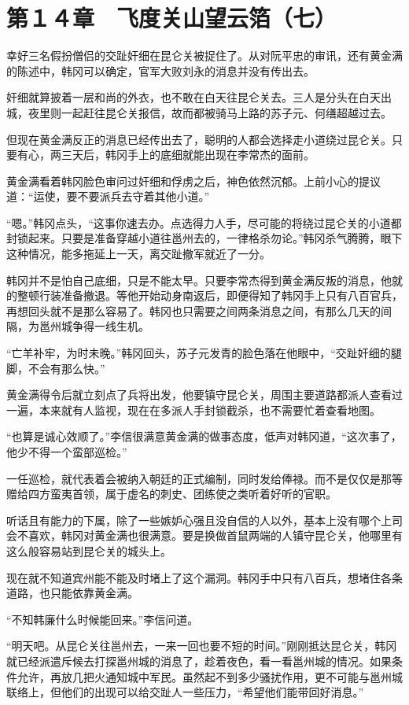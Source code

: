 \section{第１４章　飞度关山望云箔（七）}

幸好三名假扮僧侣的交趾奸细在昆仑关被捉住了。从对阮平忠的审讯，还有黄金满的陈述中，韩冈可以确定，官军大败刘永的消息并没有传出去。

奸细就算披着一层和尚的外衣，也不敢在白天往昆仑关去。三人是分头在白天出城，夜里则一起赶往昆仑关报信，故而都被骑马上路的苏子元、何缮超越过去。

但现在黄金满反正的消息已经传出去了，聪明的人都会选择走小道绕过昆仑关。只要有心，两三天后，韩冈手上的底细就能出现在李常杰的面前。

黄金满看着韩冈脸色审问过奸细和俘虏之后，神色依然沉郁。上前小心的提议道：“运使，要不要派兵去守着其他小道。”

“嗯。”韩冈点头，“这事你速去办。点选得力人手，尽可能的将绕过昆仑关的小道都封锁起来。只要是准备穿越小道往邕州去的，一律格杀勿论。”韩冈杀气腾腾，眼下这种情况，能多拖延上一天，离交趾撤军就近了一分。

韩冈并不是怕自己底细，只是不能太早。只要李常杰得到黄金满反叛的消息，他就的整顿行装准备撤退。等他开始动身南返后，即便得知了韩冈手上只有八百官兵，再想回头就不是那么容易了。韩冈也只需要之间两条消息之间，有那么几天的间隔，为邕州城争得一线生机。

“亡羊补牢，为时未晚。”韩冈回头，苏子元发青的脸色落在他眼中，“交趾奸细的腿脚，不会有那么快。”

黄金满得令后就立刻点了兵将出发，他要镇守昆仑关，周围主要道路都派人查看过一遍，本来就有人监视，现在在多派人手封锁截杀，也不需要忙着查看地图。

“也算是诚心效顺了。”李信很满意黄金满的做事态度，低声对韩冈道，“这次事了，他少不得一个蛮部巡检。”

一任巡检，就代表着会被纳入朝廷的正式编制，同时发给俸禄。而不是仅仅是那等赠给四方蛮夷首领，属于虚名的刺史、团练使之类听着好听的官职。

听话且有能力的下属，除了一些嫉妒心强且没自信的人以外，基本上没有哪个上司会不喜欢，韩冈对黄金满也很满意。要是换做首鼠两端的人镇守昆仑关，他哪里有这么般容易站到昆仑关的城头上。

现在就不知道宾州能不能及时堵上了这个漏洞。韩冈手中只有八百兵，想堵住各条道路，也只能依靠黄金满。

“不知韩廉什么时候能回来。”李信问道。

“明天吧。从昆仑关往邕州去，一来一回也要不短的时间。”刚刚抵达昆仑关，韩冈就已经派遣斥候去打探邕州城的消息了，趁着夜色，看一看邕州城的情况。如果条件允许，再放几把火通知城中军民。虽然起不到多少骚扰作用，更不可能与邕州城联络上，但他们的出现可以给交趾人一些压力，“希望他们能带回好消息。”

